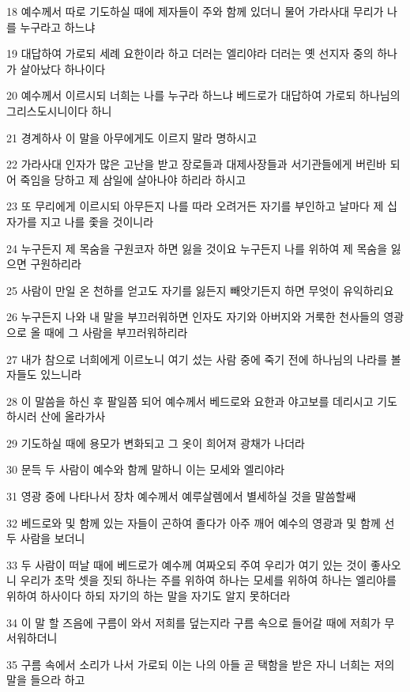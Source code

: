 \par 18 예수께서 따로 기도하실 때에 제자들이 주와 함께 있더니 물어 가라사대 무리가 나를 누구라고 하느냐
\par 19 대답하여 가로되 세례 요한이라 하고 더러는 엘리야라 더러는 옛 선지자 중의 하나가 살아났다 하나이다
\par 20 예수께서 이르시되 너희는 나를 누구라 하느냐 베드로가 대답하여 가로되 하나님의 그리스도시니이다 하니
\par 21 경계하사 이 말을 아무에게도 이르지 말라 명하시고
\par 22 가라사대 인자가 많은 고난을 받고 장로들과 대제사장들과 서기관들에게 버린바 되어 죽임을 당하고 제 삼일에 살아나야 하리라 하시고
\par 23 또 무리에게 이르시되 아무든지 나를 따라 오려거든 자기를 부인하고 날마다 제 십자가를 지고 나를 좇을 것이니라
\par 24 누구든지 제 목숨을 구원코자 하면 잃을 것이요 누구든지 나를 위하여 제 목숨을 잃으면 구원하리라
\par 25 사람이 만일 온 천하를 얻고도 자기를 잃든지 빼앗기든지 하면 무엇이 유익하리요
\par 26 누구든지 나와 내 말을 부끄러워하면 인자도 자기와 아버지와 거룩한 천사들의 영광으로 올 때에 그 사람을 부끄러워하리라
\par 27 내가 참으로 너희에게 이르노니 여기 섰는 사람 중에 죽기 전에 하나님의 나라를 볼 자들도 있느니라
\par 28 이 말씀을 하신 후 팔일쯤 되어 예수께서 베드로와 요한과 야고보를 데리시고 기도하시러 산에 올라가사
\par 29 기도하실 때에 용모가 변화되고 그 옷이 희어져 광채가 나더라
\par 30 문득 두 사람이 예수와 함께 말하니 이는 모세와 엘리야라
\par 31 영광 중에 나타나서 장차 예수께서 예루살렘에서 별세하실 것을 말씀할쌔
\par 32 베드로와 및 함께 있는 자들이 곤하여 졸다가 아주 깨어 예수의 영광과 및 함께 선 두 사람을 보더니
\par 33 두 사람이 떠날 때에 베드로가 예수께 여짜오되 주여 우리가 여기 있는 것이 좋사오니 우리가 초막 셋을 짓되 하나는 주를 위하여 하나는 모세를 위하여 하나는 엘리야를 위하여 하사이다 하되 자기의 하는 말을 자기도 알지 못하더라
\par 34 이 말 할 즈음에 구름이 와서 저희를 덮는지라 구름 속으로 들어갈 때에 저희가 무서워하더니
\par 35 구름 속에서 소리가 나서 가로되 이는 나의 아들 곧 택함을 받은 자니 너희는 저의 말을 들으라 하고
